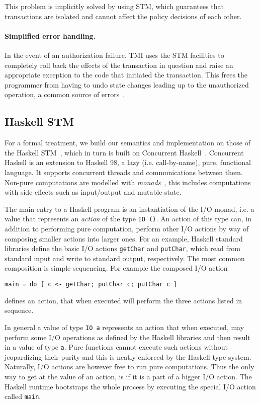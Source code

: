 This problem is implicitly solved by using STM, which guarantees that transactions are 
isolated and cannot affect the policy decisions of each other.

\paragraph{Simplified error handling.} In the event of an authorization failure, TMI uses the STM
facilities to completely roll back the effects of the transaction in question and raise an appropriate
exception to the code that initiated the transaction. This frees the programmer from having to
undo state changes leading up to the unauthorized operation, a common source of 
errors~\cite{errorHandlingMistakes}.


\subsection{Haskell STM} %
\label{sub:haskell_stm}

For a formal treatment, we build our semantics and implementation on those of the Haskell STM~\cite{haskellstm},
which in turn is built on Concurrent Haskell~\cite{concurrenthaskell}. Concurrent Haskell is an extension to Haskell 98,
a lazy (i.e. call-by-name), pure, functional language. It supports concurrent threads and communications
between them. Non-pure computations are modelled with {\em monads}~\cite{monads}, this includes computations
with side-effects such as input/output and mutable state.

The main entry to a Haskell program is an instantiation of the I/O monad, i.e. a value that represents an
{\em action} of the type \lstinline+IO ()+. An action of this type can, in addition to performing pure
computation, perform other I/O actions by way of composing smaller actions into larger ones. For an example,
Haskell standard libraries define the basic I/O actions \lstinline+getChar+ and \lstinline+putChar+, which
read from standard input and write to standard output, respectively. The most common composition is simple
sequencing. For example the composed I/O action
\begin{lstlisting}[style=small]
main = do { c <- getChar; putChar c; putChar c }
\end{lstlisting}
defines an action, that when executed will perform the three actions listed in sequence.

In general a value of type \lstinline+IO a+ represents an action that when executed, may perform some
I/O operations as defined by the Haskell libraries and then result in a value of type \lstinline+a+.
Pure functions cannot execute such actions without jeopardizing their purity and this is neatly enforced
by the Haskell type system. Naturally, I/O actions are however free to run pure computations. Thus
the only way to get at the value of an action, is if it is a part of a bigger I/O action. The Haskell
runtime bootstraps the whole process by executing the special I/O action called \lstinline+main+.

